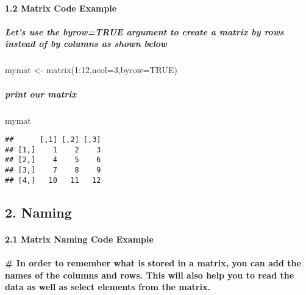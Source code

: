\documentclass[
]{article}
\newenvironment{Shaded}{\begin{snugshade}}{\end{snugshade}}
\newcommand{\AttributeTok}[1]{\textcolor[rgb]{0.77,0.63,0.00}{#1}}
\newcommand{\ConstantTok}[1]{\textcolor[rgb]{0.00,0.00,0.00}{#1}}
\newcommand{\DecValTok}[1]{\textcolor[rgb]{0.00,0.00,0.81}{#1}}
\newcommand{\FunctionTok}[1]{\textcolor[rgb]{0.00,0.00,0.00}{#1}}
\newcommand{\NormalTok}[1]{#1}
\newcommand{\OtherTok}[1]{\textcolor[rgb]{0.56,0.35,0.01}{#1}}
\newcommand{\SpecialCharTok}[1]{\textcolor[rgb]{0.00,0.00,0.00}{#1}}
\begin{document}
\hypertarget{matrix-code-example-1}{%
\paragraph{1.2 Matrix Code Example}\label{matrix-code-example-1}}

\hypertarget{lets-use-the-byrowtrue-argument-to-create-a-matrix-by-rows-instead-of-by-columns-as-shown-below}{%
\subparagraph{Let's use the byrow=TRUE argument to create a matrix by
rows instead of by columns as shown
below}\label{lets-use-the-byrowtrue-argument-to-create-a-matrix-by-rows-instead-of-by-columns-as-shown-below}}

\begin{Shaded}
\begin{Highlighting}[]
\NormalTok{mymat }\OtherTok{\textless{}{-}} \FunctionTok{matrix}\NormalTok{(}\DecValTok{1}\SpecialCharTok{:}\DecValTok{12}\NormalTok{,}\AttributeTok{ncol=}\DecValTok{3}\NormalTok{,}\AttributeTok{byrow=}\ConstantTok{TRUE}\NormalTok{)}
\end{Highlighting}
\end{Shaded}

\hypertarget{print-our-matrix}{%
\subparagraph{print our matrix}\label{print-our-matrix}}

\begin{Shaded}
\begin{Highlighting}[]
\NormalTok{mymat}
\end{Highlighting}
\end{Shaded}

\begin{verbatim}
##      [,1] [,2] [,3]
## [1,]    1    2    3
## [2,]    4    5    6
## [3,]    7    8    9
## [4,]   10   11   12
\end{verbatim}

\hypertarget{naming}{%
\subsection{2. Naming}\label{naming}}

\hypertarget{matrix-naming-code-example}{%
\paragraph{2.1 Matrix Naming Code
Example}\label{matrix-naming-code-example}}

\hypertarget{in-order-to-remember-what-is-stored-in-a-matrix-you-can-add-the-names-of-the-columns-and-rows.-this-will-also-help-you-to-read-the-data-as-well-as-select-elements-from-the-matrix.}{%
\paragraph{\# In order to remember what is stored in a matrix, you can
add the names of the columns and rows. This will also help you to read
the data as well as select elements from the
matrix.}\label{in-order-to-remember-what-is-stored-in-a-matrix-you-can-add-the-names-of-the-columns-and-rows.-this-will-also-help-you-to-read-the-data-as-well-as-select-elements-from-the-matrix.}}
\end{document}
